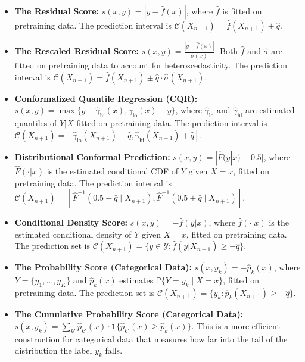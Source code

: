 \begin{itemize}
    \item \textbf{The Residual Score:} $s(x, y) = |y - \widehat{f}(x)|$, where $\widehat{f}$ is fitted on pretraining data. The prediction interval is $\mathcal{C}(X_{n+1}) = \widehat{f}(X_{n+1}) \pm \widehat{q}$.

    \item \textbf{The Rescaled Residual Score:} $s(x, y) = \frac{|y - \widehat{f}(x)|}{\widehat{\sigma}(x)}$. Both $\widehat{f}$ and $\widehat{\sigma}$ are fitted on pretraining data to account for heteroscedasticity. The prediction interval is $\mathcal{C}(X_{n+1}) = \widehat{f}(X_{n+1}) \pm \widehat{q} \cdot \widehat{\sigma}(X_{n+1})$.

    \item \textbf{Conformalized Quantile Regression (CQR):} $s(x, y) = \max \{y - \widehat{\gamma}_{\text{hi}}(x), \widehat{\gamma}_{\text{lo}}(x) - y\}$, where $\widehat{\gamma}_{\text{lo}}$ and $\widehat{\gamma}_{\text{hi}}$ are estimated quantiles of $Y|X$ fitted on pretraining data. The prediction interval is $\mathcal{C}(X_{n+1}) = [\widehat{\gamma}_{\text{lo}}(X_{n+1}) - \widehat{q}, \widehat{\gamma}_{\text{hi}}(X_{n+1}) + \widehat{q}]$.

    \item \textbf{Distributional Conformal Prediction:} $s(x, y) = |\widehat{F}(y|x) - 0.5|$, where $\widehat{F}(\cdot|x)$ is the estimated conditional CDF of $Y$ given $X=x$, fitted on pretraining data. The prediction interval is $\mathcal{C}(X_{n+1}) = [\widehat{F}^{-1}(0.5 - \widehat{q} \mid X_{n+1}), \widehat{F}^{-1}(0.5 + \widehat{q} \mid X_{n+1})]$.

    \item \textbf{Conditional Density Score:} $s(x, y) = -\widehat{f}(y|x)$, where $\widehat{f}(\cdot|x)$ is the estimated conditional density of $Y$ given $X=x$, fitted on pretraining data. The prediction set is $\mathcal{C}(X_{n+1}) = \{y \in \mathcal{Y} : \widehat{f}(y|X_{n+1}) \geq -\widehat{q}\}$.

    \item \textbf{The Probability Score (Categorical Data):} $s(x, y_k) = -\widehat{p}_k(x)$, where $Y = \{y_1, \dots, y_K\}$ and $\widehat{p}_k(x)$ estimates $\mathbb{P}\{Y = y_k \mid X = x\}$, fitted on pretraining data. The prediction set is $\mathcal{C}(X_{n+1}) = \{y_k : \widehat{p}_k(X_{n+1}) \geq -\widehat{q}\}$.

    \item \textbf{The Cumulative Probability Score (Categorical Data):} $s(x, y_k) = \sum_{k'} \widehat{p}_{k'}(x) \cdot \mathbf{1}\{\widehat{p}_{k'}(x) \geq \widehat{p}_k(x)\}$. This is a more efficient construction for categorical data that measures how far into the tail of the distribution the label $y_k$ falls.
\end{itemize}

